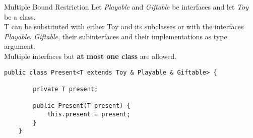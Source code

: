 \begin{frame}[fragile]{Multiple Bound Restriction}
	Let \emph{Playable} and \emph{Giftable} be interfaces and let \emph{Toy} be a class. \\
	T can be substituted with either Toy and its subclasses 
	or with the interfaces \emph{Playable}, \emph{Giftable}, their subinterfaces
	and their implementations as type argument. \\
	Multiple interfaces but \textbf{at most one class} are allowed.
	\begin{lstlisting}[basicstyle=\ttfamily\scriptsize]
	public class Present<T extends Toy & Playable & Giftable> {
	    
	    private T present;
	    
	    public Present(T present) {
	        this.present = present;
	    }
	}
	\end{lstlisting}	
\end{frame}


%
%
%	
%
%

